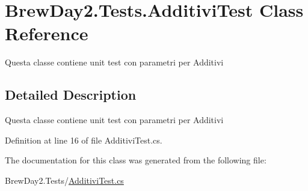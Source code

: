 \hypertarget{class_brew_day2_1_1_tests_1_1_additivi_test}{}\section{Brew\+Day2.\+Tests.\+Additivi\+Test Class Reference}
\label{class_brew_day2_1_1_tests_1_1_additivi_test}


Questa classe contiene unit test con parametri per Additivi 




\subsection{Detailed Description}
Questa classe contiene unit test con parametri per Additivi



Definition at line 16 of file Additivi\+Test.\+cs.



The documentation for this class was generated from the following file\+:\begin{DoxyCompactItemize}
\item 
Brew\+Day2.\+Tests/\mbox{\hyperlink{_additivi_test_8cs}{Additivi\+Test.\+cs}}\end{DoxyCompactItemize}
